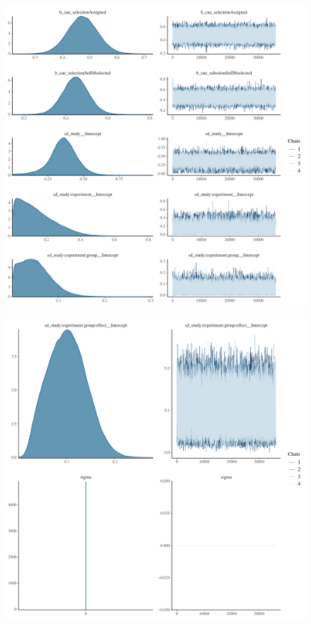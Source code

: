 \documentclass[
]{report}
\begin{document}
\begin{figure}

{\centering \includegraphics[width=1\textwidth,height=\textheight]{diagnostic_plots_files/figure-pdf/unnamed-chunk-20-1.pdf}

}

\end{figure}

\begin{figure}

{\centering \includegraphics[width=1\textwidth,height=\textheight]{diagnostic_plots_files/figure-pdf/unnamed-chunk-20-2.pdf}

}

\end{figure}
\end{document}
